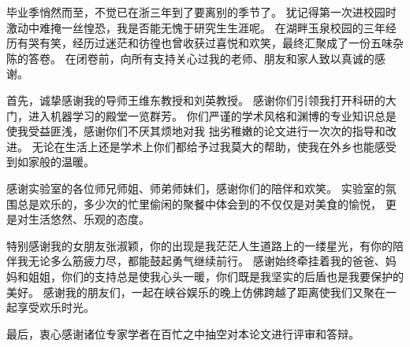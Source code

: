 \cleardoublepage
{}
毕业季悄然而至，不觉已在浙三年到了要离别的季节了。
犹记得第一次进校园时激动中难掩一丝惶恐，我是否能无愧于研究生生涯呢。
在湖畔玉泉校园的三年经历有哭有笑，经历过迷茫和彷徨也曾收获过喜悦和欢笑，最终汇聚成了一份五味杂陈的答卷。
在闭卷前，向所有支持关心过我的老师、朋友和家人致以真诚的感谢。

首先，诚挚感谢我的导师王维东教授和刘英教授。
感谢你们引领我打开科研的大门，进入机器学习的殿堂一览群芳。
你们严谨的学术风格和渊博的专业知识总是使我受益匪浅，感谢你们不厌其烦地对我
拙劣稚嫩的论文进行一次次的指导和改进。
无论在生活上还是学术上你们都给予过我莫大的帮助，使我在外乡也能感受到如家般的温暖。

感谢实验室的各位师兄师姐、师弟师妹们，感谢你们的陪伴和欢笑。
实验室的氛围总是欢乐的，多少次的忙里偷闲的聚餐中体会到的不仅仅是对美食的愉悦，
更是对生活悠然、乐观的态度。

特别感谢我的女朋友张淑颖，你的出现是我茫茫人生道路上的一缕星光，有你的陪伴我无论多么筋疲力尽，都能鼓起勇气继续前行。
感谢始终牵挂着我的爸爸、妈妈和姐姐，你们的支持总是使我心头一暖，你们既是我坚实的后盾也是我要保护的美好。
感谢我的朋友们，一起在峡谷娱乐的晚上仿佛跨越了距离使我们又聚在一起享受欢乐时光。

最后，衷心感谢诸位专家学者在百忙之中抽空对本论文进行评审和答辩。